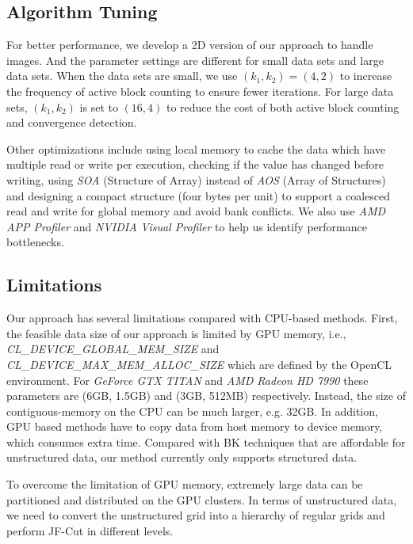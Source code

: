 \subsection{\textbf{Algorithm Tuning}}

For better performance, we develop a 2D version of our approach to handle images.
And the parameter settings are different for small data sets and large data sets.
When the data sets are small, we use $(k_1, k_2) = (4, 2)$ to increase the frequency of active block counting to ensure fewer iterations.
For large data sets, $(k_1, k_2)$ is set to $(16, 4)$ to reduce the cost of both active block counting and convergence detection.

Other optimizations include using local memory to cache the data which have multiple read or write per execution, checking if the value has changed before writing, using \textit{SOA} (Structure of Array) instead of \textit{AOS} (Array of Structures) and designing a compact structure (four bytes per unit) to support a coalesced read and write for global memory and avoid bank conflicts.
We also use \textit{AMD APP Profiler} and \textit{NVIDIA Visual Profiler} to help us identify performance bottlenecks.

\subsection{\textbf{Limitations}}

Our approach has several limitations compared with CPU-based methods.
First, the feasible data size of our approach is limited by GPU memory, i.e., \textit{CL\_DEVICE\_GLOBAL\_MEM\_SIZE} and \textit{CL\_DEVICE\_MAX\_MEM\_ALLOC\_SIZE} which are defined by the OpenCL environment.
For \textit{GeForce GTX TITAN} and \textit{AMD Radeon HD 7990} these parameters are (6GB, 1.5GB) and (3GB, 512MB) respectively.
Instead, the size of contiguous-memory on the CPU can be much larger, e.g. 32GB.
In addition, GPU based methods have to copy data from host memory to device memory, which consumes extra time.
Compared with BK techniques that are affordable for unstructured data, our method currently only supports structured data.

To overcome the limitation of GPU memory, extremely large data can be partitioned and distributed on the GPU clusters.
In terms of unstructured data, we need to convert the unstructured grid into a hierarchy of regular grids and perform JF-Cut in different levels.